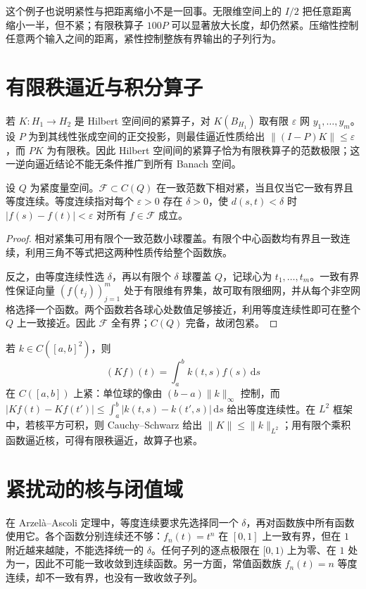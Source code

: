这个例子也说明紧性与把距离缩小不是一回事。无限维空间上的 $I/2$ 把任意距离缩小一半，但不紧；有限秩算子 $100P$ 可以显著放大长度，却仍然紧。压缩性控制任意两个输入之间的距离，紧性控制整族有界输出的子列行为。

\section{有限秩逼近与积分算子}
若 $K:H_1\to H_2$ 是 Hilbert 空间间的紧算子，对 $K(B_{H_1})$ 取有限 $\varepsilon$ 网 $y_1,\ldots,y_m$。设 $P$ 为到其线性张成空间的正交投影，则最佳逼近性质给出 $\|(I-P)K\|\leq\varepsilon$，而 $PK$ 为有限秩。因此 Hilbert 空间间的紧算子恰为有限秩算子的范数极限；这一逆向逼近结论不能无条件推广到所有 Banach 空间。

\begin{theorem}\label{thm:fa-ascoli}
设 $Q$ 为紧度量空间。$\mathcal F\subset C(Q)$ 在一致范数下相对紧，当且仅当它一致有界且等度连续。等度连续指对每个 $\varepsilon>0$ 存在 $\delta>0$，使 $d(s,t)<\delta$ 时 $|f(s)-f(t)|<\varepsilon$ 对所有 $f\in\mathcal F$ 成立。
\end{theorem}
\begin{proof}
相对紧集可用有限个一致范数小球覆盖。有限个中心函数均有界且一致连续，利用三角不等式把这两种性质传给整个函数族。

反之，由等度连续性选 $\delta$，再以有限个 $\delta$ 球覆盖 $Q$，记球心为 $t_1,\ldots,t_m$。一致有界性保证向量 $(f(t_j))_{j=1}^m$ 处于有限维有界集，故可取有限细网，并从每个非空网格选择一个函数。两个函数若各球心处数值足够接近，利用等度连续性即可在整个 $Q$ 上一致接近。因此 $\mathcal F$ 全有界；$C(Q)$ 完备，故闭包紧。
\end{proof}
若 $k\in C([a,b]^2)$，则
\[
 (Kf)(t)=\int_a^b k(t,s)f(s)\,\mathrm ds
\]
在 $C([a,b])$ 上紧：单位球的像由 $(b-a)\|k\|_\infty$ 控制，而 $|Kf(t)-Kf(t')|\leq\int_a^b|k(t,s)-k(t',s)|\,\mathrm ds$ 给出等度连续性。在 $L^2$ 框架中，若核平方可积，则 Cauchy--Schwarz 给出 $\|K\|\leq\|k\|_{L^2}$；用有限个乘积函数逼近核，可得有限秩逼近，故算子也紧。

\section{紧扰动的核与闭值域}
在 Arzelà--Ascoli 定理中，等度连续要求先选择同一个 $\delta$，再对函数族中所有函数使用它。各个函数分别连续还不够：$f_n(t)=t^n$ 在 $[0,1]$ 上一致有界，但在 $1$ 附近越来越陡，不能选择统一的 $\delta$。任何子列的逐点极限在 $[0,1)$ 上为零、在 $1$ 处为一，因此不可能一致收敛到连续函数。另一方面，常值函数族 $f_n(t)=n$ 等度连续，却不一致有界，也没有一致收敛子列。

